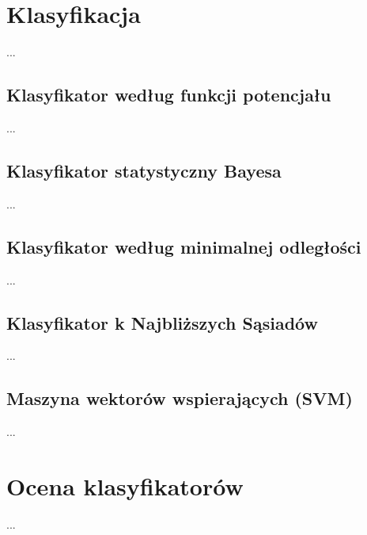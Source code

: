 \section{Klasyfikacja}
...


\subsection{Klasyfikator według funkcji potencjału}
...
	
\subsection{Klasyfikator statystyczny Bayesa}
...
	
\subsection{Klasyfikator według minimalnej odległości}
...
	
\subsection{Klasyfikator k Najbliższych Sąsiadów}
...

\subsection{Maszyna wektorów wspierających (SVM)}
...
	
\section{Ocena klasyfikatorów}
...
